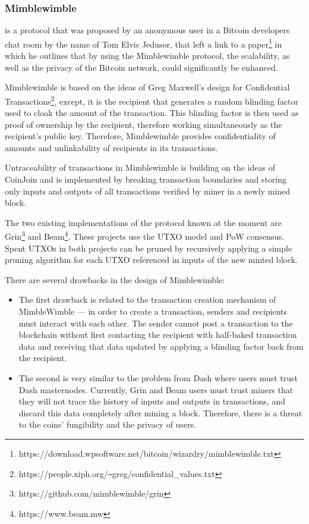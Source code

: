 \documentclass[a4paper, 10pt, conference]{ieeeconf}
\begin{document}
\subsubsection{Mimblewimble} is a protocol that was proposed by an anonymous user in a Bitcoin developers chat room by the name of Tom Elvis Jedusor, that left a link to a paper\footnote{https://download.wpsoftware.net/bitcoin/wizardry/mimblewimble.txt} in which he outlines that by using the Mimblewimble protocol, the scalability, as well as the privacy of the Bitcoin network, could significantly be enhanced.

Mimblewimble is based on the ideas of Greg Maxwell's design for Confidential Transactions\footnote{https://people.xiph.org/\texttt{\~}greg/confidential\_values.txt}, except, it is the recipient that generates a random blinding factor used to cloak the amount of the transaction. This blinding factor is then used as proof of ownership by the recipient, therefore working simultaneously as the recipient's public key. Therefore, Mimblewimble provides confidentiality of amounts and unlinkability of recipients in its transactions.

Untraceability of transactions in Mimblewimble is building on the ideas of CoinJoin and is implemented by breaking transaction boundaries and storing only inputs and outputs of all transactions verified by miner in a newly mined block.

The two existing implementations of the protocol known at the moment are Grin\footnote{https://github.com/mimblewimble/grin} and Beam\footnote{https://www.beam.mw}. These projects use the UTXO model and PoW consensus. Spent UTXOs in both projects can be pruned by recursively applying a simple pruning algorithm for each UTXO referenced in inputs of the new minted block.

There are several drawbacks in the design of Mimblewimble:

\begin{itemize}
	\item {The first drawback is related to the transaction creation mechanism of MimbleWimble --- in order to create a transaction, senders and recipients must interact with each other. The sender cannot post a transaction to the blockchain without first contacting the recipient with half-baked transaction data and receiving that data updated by applying a blinding factor back from the recipient.}
	\item {The second is very similar to the problem from Dash where users must trust Dash masternodes. Currently, Grin and Beam users must trust miners that they will not trace the history of inputs and outputs in transactions, and discard this data completely after mining a block. Therefore, there is a threat to the coins' fungibility and the privacy of users.}
\end{itemize}

\listoftodos
\end{document}
